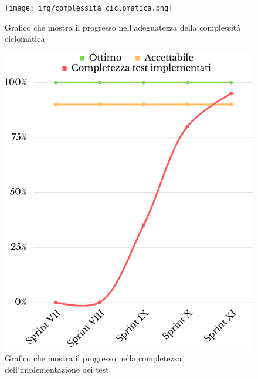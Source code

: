 \begin{figure}[H]
	\centering
	\texttt{[image: img/complessità\_ciclomatica.png]}
	\caption{Grafico che mostra il progresso nell'adeguatezza della complessità ciclomatica}
\end{figure}
\begin{figure}[H]
	\centering
	\includegraphics[scale=0.35]{img/completezza_test.png}
	\caption{Grafico che mostra il progresso nella completezza dell'implementazione dei test}
\end{figure}
